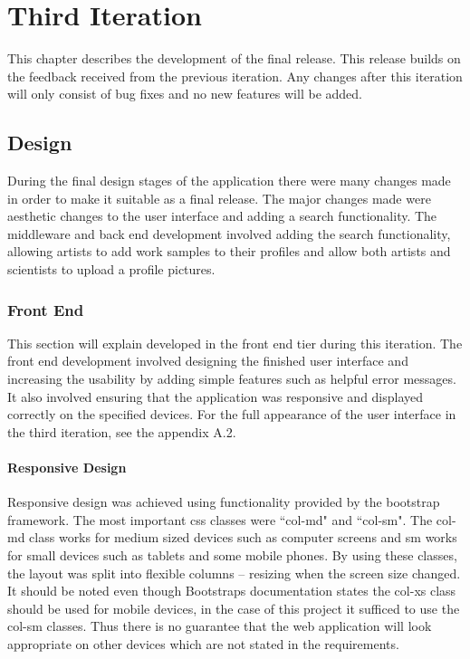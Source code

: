 \documentclass[a4paper,oneside,11pt]{report}
\begin{document}
\chapter{Third Iteration}
This chapter describes the development of the final release. This release builds on the feedback received from the previous iteration. Any changes after this iteration will only consist of bug fixes and no new features will be added.
\section{Design}
During the final design stages of the application there were many changes made in order to make it suitable as a final release. The major changes made were aesthetic changes to the user interface and adding a search functionality.
The middleware and back end development involved adding the search functionality, allowing artists to add work samples to their profiles and allow both artists and scientists to upload a profile pictures.
\subsection{Front End}
This section will explain developed in the front end tier during this iteration. The front end development involved designing the finished user interface and increasing the usability by adding simple features such as helpful error messages. It also involved ensuring that the application was responsive and displayed correctly on the specified devices.
For the full appearance of the user interface in the third iteration, see the appendix A.2.
\pagebreak
\subsubsection{Responsive Design}
Responsive design was achieved using functionality provided by the bootstrap framework. The most important css classes were ``col-md" and ``col-sm". The col-md class works for medium sized devices such as computer screens and sm works for small devices such as tablets and some mobile phones. By using these classes, the layout was split into flexible columns – resizing when the screen size changed. It should be noted even though Bootstraps documentation states the col-xs class should be used for mobile devices, in the case of this project it sufficed to use the col-sm classes. Thus there is no guarantee that the web application will look appropriate on other devices which are not stated in the requirements.
\end{document}
